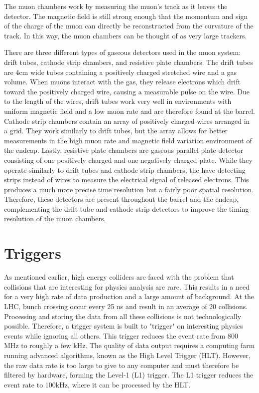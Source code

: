 The muon chambers work by measuring the muon's track as it leaves the detector. The magnetic field is still strong enough that the momentum  and sign of the charge of the muon can directly be reconstructed from the curvature of the track. In this way, the muon chambers can be thought of as very large trackers. 

There are three different types of gaseous detectors used in the muon system: drift tubes, cathode strip chambers, and resistive plate chambers. The drift tubes are 4cm wide tubes containing a positively charged stretched wire and a gas volume. When muons interact with the gas, they release electrons which drift toward the positively charged wire, causing a measurable pulse on the wire. Due to the length of the wires, drift tubes work very well in environments with uniform magnetic field and a low muon rate and are therefore found at the barrel. Cathode strip chambers contain an array of positively charged wires arranged in a grid. They work similarly to drift tubes, but the array allows for better measurements in the high muon rate and magnetic field variation environment of the endcap. Lastly, resistive plate chambers are gaseous parallel-plate detector consisting of one positively charged and one negatively charged plate. While they operate similarly to drift tubes and cathode strip chambers, the have detecting strips instead of wires to measure the electrical signal of released electrons. This produces a much more precise time resolution but a fairly poor spatial resolution. Therefore, these detectors are present throughout the barrel and the endcap, complementing the drift tube and cathode strip detectors to improve the timing resolution of the muon chambers. 




\section{Triggers}
\label{sec:triggers}

As mentioned earlier, high energy colliders are faced with the problem that collisions that are interesting for physics analysis are rare. This results in a need for a very high rate of data production and a large amount of background. 
At the LHC, bunch crossing occur every 25 ns and result in an average of 20 collisions. Processing and storing the data from all these collisions is not technologically possible. Therefore, a trigger system is built to "trigger" on interesting physics events while ignoring all others. This trigger reduces the event rate from 800 MHz to roughly a few kHz. The quality of data output requires a computing farm running advanced algorithms, known as the High Level Trigger (HLT). However, the raw data rate is too large to give to any computer and must therefore be filtered by hardware, forming the Level-1 (L1) trigger. The L1 trigger reduces the event rate to 100kHz, where it can be processed by the HLT. %


